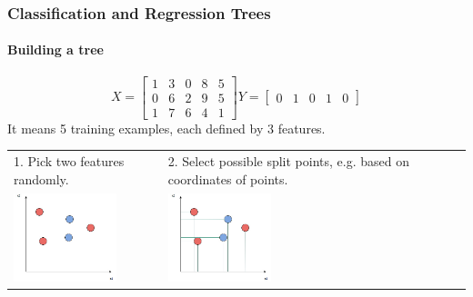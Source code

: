 \begin{frame}
	\frametitle{Classification and Regression Trees}
		\framesubtitle{Building a tree}
		\[
		X=
		\left[ {\begin{array}{ccccc}
		1 &3 & 0 & 8 & 5\\
		0& 6 & 2 & 9 & 5\\
		1 & 7 & 6 & 4 & 1
		\end{array} } \right]
		Y=
		\left[ {\begin{array}{ccccc}
		0 & 1 & 0 & 1 & 0
		\end{array} } \right]
		\] 
		It means 5 training examples, each defined by 3 features.
		\begin{center}
		\begin{tabular}{m{5cm} m{5cm}}
		1. Pick two features randomly.
		&
		2. Select possible split points, e.g. based on coordinates of points. \\
		\includegraphics[width=3cm]{./figures/macierz1}
		&
		\includegraphics[width=3cm]{./figures/macierz2}
		\\
		\end{tabular}
		\end{center}
		
\end{frame}

